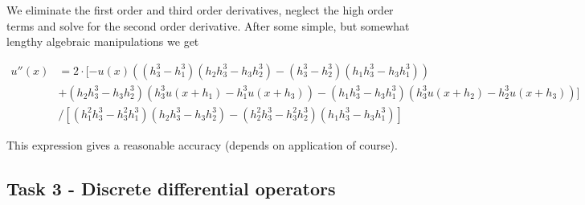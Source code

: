 \documentclass[paper=a4, fontsize=12pt]{article} %
\begin{document}
We eliminate the first order and third order derivatives, neglect the high order terms and solve for the second order derivative. After some simple, but somewhat lengthy algebraic manipulations we get

\begin{align*}
u''(x) &= 2\cdot [ -u(x)((h_3^3 - h_1^3)(h_2h_3^3 - h_3h_2^3)-(h_3^3-h_2^3)(h_1h_3^3-h_3h_1^3))  \\
& + (h_2h_3^3 - h_3h_2^3)(h_3^3u(x+h_1)-h_1^3u(x+h_3))  - (h_1h_3^3 - h_3h_1^3 )(h_3^3 u(x+h_2) -h_2^3 u(x+h_3)) ]\\
&  /  [(h_1^2 h_3^3 - h_3^2 h_1^3 )(h_2 h_3^3 - h_3 h_2^3 )-( h_2^2 h_3^3 - h_3^2 h_2^3 )(h_1 h_3^3 - h_3 h_1^3) ]
\end{align*}

This expression gives a reasonable accuracy (depends on application of course).






%
%
%
%
%
%

\subsection*{Task 3 - Discrete differential operators}
\end{document}
